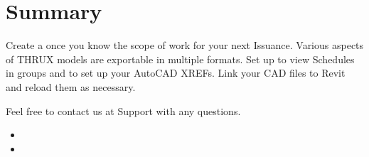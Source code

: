 \documentclass[letterpaper,10pt,english]{sphinxmanual}
\begin{document}
\chapter{Summary}
\label{\detokenize{index:summary}}
Create a {\hyperref[\detokenize{index:branching}]{}} once you know the scope of work for your next Issuance.  Various aspects of THRUX models are exportable in multiple formats.  Set up {\hyperref[\detokenize{index:schedule-views}]{}} to view Schedules in groups and to set up your AutoCAD XREFs.  Link your CAD files to Revit and reload them as necessary.

Feel free to contact us at Support with any questions.
\begin{itemize}
\item {} 

\item {} 

\end{itemize}



\renewcommand{\indexname}{Index}
\printindex
\end{document}
